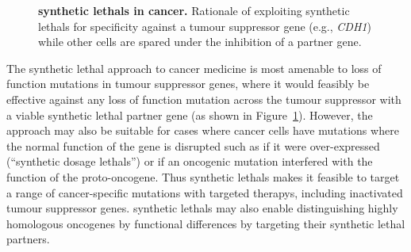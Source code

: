 \begin{figure}[!ht]
      \caption[\Glspl{synthetic lethal} in cancer]{\small \textbf{\Glspl{synthetic lethal} in cancer.} Rationale of exploiting \glspl{synthetic lethal} for specificity against a \gls{tumour suppressor} gene (e.g.,  \textit{CDH1}) while other cells are spared under the inhibition of a partner gene.}
\label{fig:SL_Concept}
\end{figure}

The \gls{synthetic lethal} approach to cancer medicine is most amenable to loss of function \glspl{mutation} in \gls{tumour suppressor} genes, where it would feasibly be effective against any loss of function \gls{mutation} across the \gls{tumour suppressor} with a viable \gls{synthetic lethal} partner gene (as shown in Figure~\ref{fig:SL_Concept}). However, the approach may also be suitable for cases where cancer cells have \glspl{mutation} where the normal function of the gene is disrupted such as if it were over-expressed (``\glspl{synthetic dosage lethal}'') or if an oncogenic \gls{mutation} interfered with the function of the proto-oncogene. Thus \glspl{synthetic lethal} makes it feasible to target a range of cancer-specific \glspl{mutation} with \glspl{targeted therapy}, including inactivated \gls{tumour suppressor} genes. \glspl{synthetic lethal} may also enable distinguishing highly homologous \glspl{oncogene} by functional differences by targeting their \gls{synthetic lethal} partners. 

